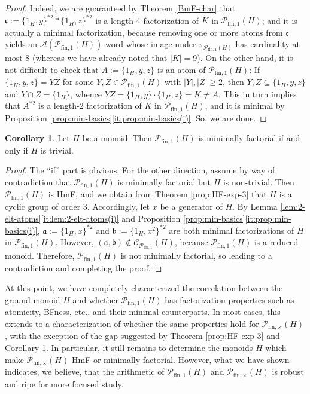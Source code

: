 \documentclass{report}
\renewcommand{\P}{\mathcal{P}}
\newcommand{\fin}{\textrm{fin}}
\newcommand{\funt}{{\textrm{fin}, \times}}
\newcommand{\fun}{{\textrm{fin}, 1}}
\renewcommand{\:}{\text{:}}
\theoremstyle{definition}
\newtheorem{cor}[defn]{Corollary}
\begin{document}
\begin{proof}
	Indeed, we are guaranteed by Theorem \ref{BmF-char} that $\mathfrak c := \{1_H,y\}^{\ast 2} \ast \{1_H,z\}^{\ast 2}$ is a length-$4$ factorization of $K$ in $\P_\fun(H)$; and it is actually a minimal factorization, because removing one or more atoms from $\mathfrak c$ yields an $\mathscr A(\mathcal P_\fun(H))$-word whose image under $\pi_{\mathcal P_\fun(H)}$ has cardinality at most $8$ (whereas we have already noted that $|K| = 9$).
	On the other hand, it is not difficult to check that $A := \{1_H, y, z\}$ is an atom of $\mathcal P_\fun(H)$: If $\{1_H, y, z\} = YZ$ for some $Y, Z \in \mathcal P_\fun(H)$ with $|Y|, |Z| \ge 2$, then $Y, Z \subseteq \{1_H, y, z\}$ and $Y \cap Z = \{1_H\}$, whence $YZ = \{1_H, y\}\cdot\{1_H, z\} = K \ne A$. This in turn implies that $A^{\ast 2}$ is a length-$2$ factorization of $K$ in $\P_\fun(H)$, and it is minimal by Proposition \ref{prop:min-basics}\ref{it:prop:min-basics(i)}.
	So, we are done.
\end{proof}

\begin{cor}\label{cor:when-reduced-pm-is-minimally-factorial}
	Let $H$ be a monoid. Then $\mathcal P_\fun(H)$ is minimally factorial if and only if $H$ is trivial.
\end{cor}

\begin{proof}
	The ``if'' part is obvious. For the other direction, assume by way of contradiction that $\mathcal P_\fun(H)$ is minimally factorial but $H$ is non-trivial. Then $\mathcal P_\fun(H)$ is HmF, and we obtain from Theorem \ref{prop:HF-exp-3} that $H$ is a cyclic group of order $3$. Accordingly, let $x$ be a generator of $H$. By Lemma \ref{lem:2-elt-atoms}\ref{it:lem:2-elt-atoms(i)} and Proposition \ref{prop:min-basics}\ref{it:prop:min-basics(i)}, $\mathfrak a := \{1_H, x\}^{\ast 2}$ and $\mathfrak b := \{1_H, x^2\}^{\ast 2}$ are both minimal factorizations of $H$ in $\mathcal P_{\fin,1}(H)$. However, $(\mathfrak a, \mathfrak b) \notin \mathscr C_{\mathcal P_\fun}(H)$, because $\mathcal P_\fun(H)$ is a reduced monoid. Therefore, $\mathcal P_\fun(H)$ is not minimally factorial, so leading to a contradiction and completing the proof.
\end{proof}
%
At this point, we have completely characterized the correlation between the ground monoid $H$ and whether $\P_\fun(H)$ has factorization properties such as atomicity, BFness, etc., and their minimal counterparts.
In most cases, this extends to a characterization of whether the same properties hold for $\P_\funt(H)$, with the exception of the gap suggested by Theorem \ref{prop:HF-exp-3} and Corollary \ref{cor:when-reduced-pm-is-minimally-factorial}.
In particular, it still remains to determine the monoids $H$ which make $\P_\funt(H)$ HmF or minimally factorial.
However, what we have shown indicates, we believe, that the arithmetic of $\P_\fun(H)$ and $\P_\funt(H)$ is robust and ripe for more focused study.
\end{document}
